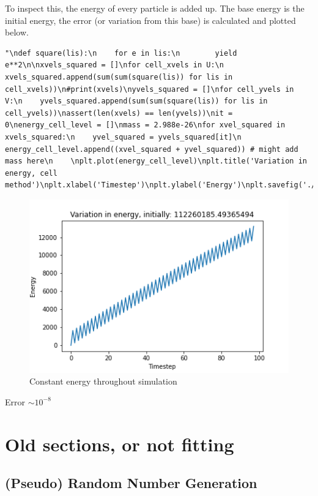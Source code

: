 \documentclass[
]{article}
\begin{document}
To inspect this, the energy of every particle is added up. The base
energy is the initial energy, the error (or variation from this base) is
calculated and plotted below.

\begin{verbatim}
"\ndef square(lis):\n    for e in lis:\n        yield e**2\n\nxvels_squared = []\nfor cell_xvels in U:\n    xvels_squared.append(sum(sum(square(lis)) for lis in cell_xvels))\n#print(xvels)\nyvels_squared = []\nfor cell_yvels in V:\n    yvels_squared.append(sum(sum(square(lis)) for lis in cell_yvels))\nassert(len(xvels) == len(yvels))\nit = 0\nenergy_cell_level = []\nmass = 2.988e-26\nfor xvel_squared in xvels_squared:\n    yvel_squared = yvels_squared[it]\n    energy_cell_level.append((xvel_squared + yvel_squared)) # might add mass here\n    \nplt.plot(energy_cell_level)\nplt.title('Variation in energy, cell method')\nplt.xlabel('Timestep')\nplt.ylabel('Energy')\nplt.savefig('./Assets/constant_energy_cellcalc.png')\nplt.close()\n"
\end{verbatim}

\begin{figure}
\centering
\includegraphics{Assets/constant_energy.png}
\caption{Constant energy throughout simulation}
\end{figure}

Error \(\sim 10^{-8}\)

\hypertarget{old-sections-or-not-fitting}{%
\section{Old sections, or not
fitting}\label{old-sections-or-not-fitting}}

\hypertarget{pseudo-random-number-generation}{%
\subsection{(Pseudo) Random Number
Generation}\label{pseudo-random-number-generation}}
\end{document}
